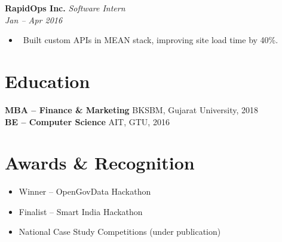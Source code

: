 \documentclass[11pt,a4paper]{article}
\newcommand{\resumeItem}[1]{\item \textbullet\ #1}
\begin{document}
\textbf{RapidOps Inc.} \hfill \textit{Software Intern}\\
\textit{Jan – Apr 2016}
\begin{itemize}[leftmargin=*,noitemsep]
  \resumeItem{Built custom APIs in MEAN stack, improving site load time by 40\%.}
\end{itemize}

\section*{Education}
\textbf{MBA – Finance \& Marketing} \hfill BKSBM, Gujarat University, 2018\\
\textbf{BE – Computer Science} \hfill AIT, GTU, 2016

\section*{Awards \& Recognition}
\begin{itemize}[leftmargin=*,noitemsep]
  \item Winner – OpenGovData Hackathon
  \item Finalist – Smart India Hackathon
  \item National Case Study Competitions (under publication)
\end{itemize}
\end{document}
